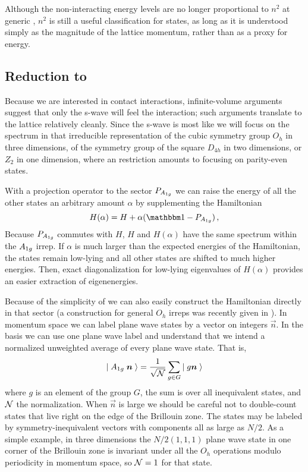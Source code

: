 Although the non-interacting energy levels are no longer proportional to $n^2$ at generic \nstep, $n^2$ is still a useful classification for states, as long as it is understood simply as the magnitude of the lattice momentum, rather than as a proxy for energy.

\subsection{Reduction to  \texorpdfstring{\Aoneg}{A-one-g}}

Because we are interested in contact interactions, infinite-volume arguments suggest that only the s-wave will feel the interaction; such arguments translate to the lattice relatively cleanly.
Since the s-wave is most like \Aoneg we will focus on the spectrum in that irreducible representation of the cubic symmetry group $O_h$ in three dimensions, of the symmetry group of the square $D_{4h}$ in two dimensions, or $Z_2$ in one dimension, where an \Aoneg restriction amounts to focusing on parity-even states.

With a projection operator to the \Aoneg sector $P_{A_{1g}}$ we can raise the energy of all the other states an arbitrary amount $\alpha$ by supplementing the Hamiltonian
\begin{equation}
    H(\alpha) = H + \alpha (\one - P_{\Aoneg}) \, ,
\end{equation}
Because $P_{A_{1g}}$ commutes with $H$, $H$ and $H(\alpha)$ have the same spectrum within the $A_{1g}$ irrep.
If $\alpha$ is much larger than the expected energies of the Hamiltonian, the \Aoneg states remain low-lying and all other states are shifted to much higher energies.
Then, exact diagonalization for low-lying eigenvalues of $H(\alpha)$ provides an easier extraction of \Aoneg eigenenergies.

Because of the simplicity of \Aoneg we can also easily construct the Hamiltonian directly in that sector (a construction for general $O_h$ irreps was recently given in ).
In momentum space we can label plane wave states by a vector on integers $\vec{n}$.
In the \Aoneg basis we can use one plane wave label and understand that we intend a normalized unweighted average of every plane wave state.
That is,
\begin{equation}
    \left|\;A_{1g}\; \boldsymbol{n}\;\right\rangle = \frac{1}{\sqrt{\mathcal{N}}} \sum_{g \in G} \left|\; g\boldsymbol{n}\;\right\rangle
\end{equation}
where $g$ is an element of the group $G$, the sum is over all inequivalent states, and $\mathcal{N}$ the normalization.
When $\vec{n}$ is large we should be careful not to double-count states that live right on the edge of the Brillouin zone.
The states may be labeled by symmetry-inequivalent vectors with components all as large as $N/2$.
As a simple example, in three dimensions the $N/2(1,1,1)$ plane wave state in one corner of the Brillouin zone is invariant under all the $O_h$ operations modulo periodicity in momentum space, so $\mathcal{N}=1$ for that state.


